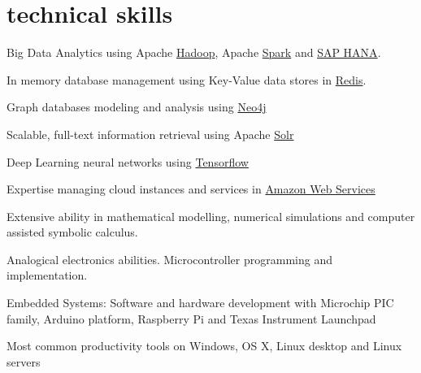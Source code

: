 \documentclass[]{friggeri-cv}
\begin{document}
\section{technical skills}
Big Data Analytics using Apache \href{http://hadoop.apache.org/}{Hadoop}, Apache \href{http://spark.apache.org/}{Spark} and \href{https://hana.sap.com/}{SAP HANA}. 

In memory database management using Key-Value data stores in \href{http://redis.io/}{Redis}.

Graph databases modeling and analysis using \href{https://neo4j.com/}{Neo4j}

Scalable, full-text information retrieval using Apache \href{http://lucene.apache.org/solr/}{Solr}

Deep Learning neural networks using \href{https://www.tensorflow.org/}{Tensorflow}
   
Expertise managing cloud instances and services in \href{http://aws.amazon.com/es/}{Amazon Web Services}

Extensive ability in mathematical modelling, numerical simulations and computer assisted symbolic calculus. 

Analogical electronics abilities. Microcontroller programming and implementation. 

Embedded Systems: Software and hardware development with Microchip PIC family, Arduino platform, Raspberry Pi and Texas Instrument Launchpad

Most common productivity tools on Windows, OS X, Linux desktop and Linux servers
   
%
\end{document}
